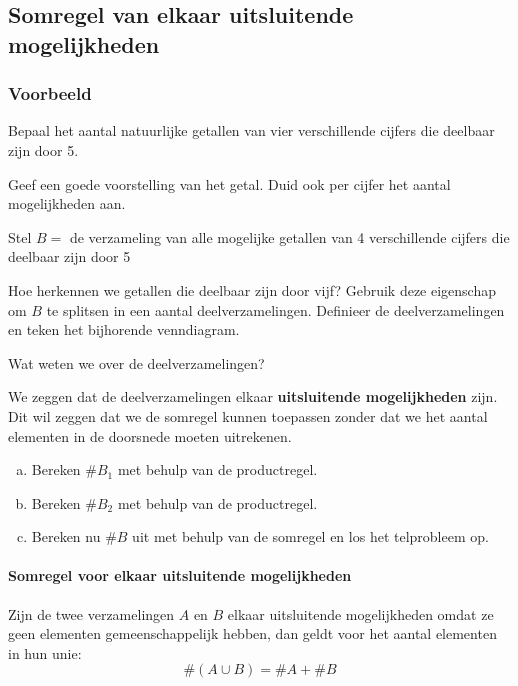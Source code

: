 \documentclass[12pt,twoside]{article}
\begin{document}
\begin{cursus}

\subsection{Somregel van elkaar uitsluitende mogelijkheden}

\subsubsection*{Voorbeeld}

Bepaal het aantal natuurlijke getallen van vier verschillende cijfers die deelbaar zijn door 5.

Geef een goede voorstelling van het getal. Duid ook per cijfer het aantal mogelijkheden aan.

Stel $B=$ de verzameling van alle mogelijke getallen van 4 verschillende cijfers die deelbaar zijn door 5

Hoe herkennen we getallen die deelbaar zijn door vijf? Gebruik deze eigenschap om $B$ te splitsen in een aantal deelverzamelingen. Definieer de deelverzamelingen en teken het bijhorende venndiagram.
\vspace*{4cm}

Wat weten we over de deelverzamelingen?

We zeggen dat de deelverzamelingen elkaar {\bf uitsluitende mogelijkheden} zijn. Dit wil zeggen dat we de somregel kunnen toepassen zonder dat we het aantal elementen in de doorsnede moeten uitrekenen.

\begin{enumerate}[(a)]
  \item Bereken $\#B_1$ met behulp van de productregel.
  \item Bereken $\#B_2$ met behulp van de productregel.
  \item Bereken nu $\#B$ uit met behulp van de somregel en los het telprobleem op.
\end{enumerate}

\paragraph*{Somregel voor elkaar uitsluitende mogelijkheden}
\begin{mdframed}
Zijn de twee verzamelingen $A$ en $B$ elkaar uitsluitende mogelijkheden omdat ze geen elementen gemeenschappelijk hebben, dan geldt voor het aantal elementen in hun unie:
$$\#(A\cup B) = \#A + \#B$$
\end{mdframed}

\end{cursus}
\end{document}
